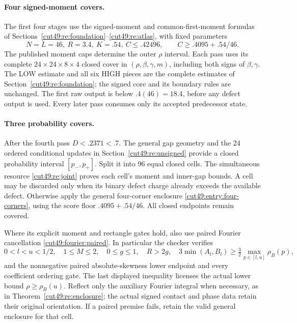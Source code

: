 \documentclass[11pt,a4paper]{article}
\numberwithin{equation}{section}
\theoremstyle{definition}
\theoremstyle{remark}
\begin{document}
\paragraph{Four signed-moment covers.}
The first four stages use the signed-moment and common-first-moment
formulas of Sections~\ref{cut49:re:foundation}--\ref{cut49:re:atlas}, with fixed parameters
\[
 N=L=46,\ R=3.4,\ K=.54,\ C\le.42496,
 \qquad C\ge.4095+.54/46.
\]
The published moment caps determine the outer $\rho$ interval.
Each pass uses its complete $24\times24\times8\times4$ closed cover
in $(\rho,\beta,\gamma,m)$, including both signs of $\beta,\gamma$.
The LOW estimate and all six HIGH pieces are the complete estimates
of Section~\ref{cut49:re:foundation}; the signed core and its boundary rules are unchanged.
The first raw output is below $.4(46)=18.4$, before any defect output
is used. Every later pass consumes only its accepted predecessor state.

\paragraph{Three probability covers.}
After the fourth pass $D<.2371<.7$. The general gap geometry and the
24 ordered conditional updates in Section~\ref{cut49:re:unsigned} provide a closed
probability interval $[p_-,p_+]$. Split it into 96 equal closed cells.
The simultaneous resource \eqref{cut49:re:joint} proves each cell's moment and inner-gap
bounds. A cell may be discarded only when its binary defect charge
already exceeds the available defect. Otherwise apply the general
four-corner enclosure \eqref{cut49:entry:four-corners}, using the score floor $.4095+.54/46$.
All closed endpoints remain covered.

Where its explicit moment and rectangle gates hold, also use paired
Fourier cancellation \eqref{cut49:fourier:paired}. In particular the checker verifies
\[
 0<l<u<1/2,\quad 1\le M\le2,\quad 0\le g\le1,\quad R>2g,
 \quad 3\min(A_l,B_l)\ge\tfrac32\max_{p\in[l,u]}\rho_B(p),
\]
and the nonnegative paired absolute-skewness lower endpoint and every
coefficient ordering gate. The last displayed inequality licenses the
actual lower bound $\rho\ge\rho_B(u)$. Reflect only the auxiliary
Fourier integral when necessary, as in Theorem~\ref{cut49:re:enclosure}; the actual signed
contact and phase data retain their original orientation. If a paired
premise fails, retain the valid general enclosure for that cell.
\end{document}
